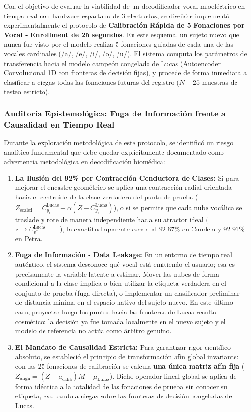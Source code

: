 \documentclass[11pt,a4paper,openany]{book}
\theoremstyle{definition}
\begin{document}
Con el objetivo de evaluar la viabilidad de un decodificador vocal mioeléctrico en tiempo real con hardware espartano de 3 electrodos, se diseñó e implementó experimentalmente el protocolo de \textbf{Calibración Rápida de 5 Fonaciones por Vocal - Enrollment de 25 segundos}. En este esquema, un sujeto nuevo que nunca fue visto por el modelo realiza 5 fonaciones guiadas de cada una de las vocales cardinales (/a/, /e/, /i/, /o/, /u/). El sistema computa los parámetros de transferencia hacia el modelo campeón congelado de Lucas (Autoencoder Convolucional 1D con fronteras de decisión fijas), y procede de forma inmediata a clasificar a ciegas todas las fonaciones futuras del registro ($N - 25$ muestras de testeo estricto).

\subsubsection{Auditoría Epistemológica: Fuga de Información frente a Causalidad en Tiempo Real}
\label{subsubsec:auditoria_epistemologica_trampa}

Durante la exploración metodológica de este protocolo, se identificó un riesgo analítico fundamental que debe quedar explícitamente documentado como advertencia metodológica en decodificación biomédica:
\begin{enumerate}
    \item \textbf{La Ilusión del 92\% por Contracción Conductora de Clases:} Si para mejorar el encastre geométrico se aplica una contracción radial orientada hacia el centroide de la clase verdadera del punto de prueba ($Z_{\text{scaled}} = C_{y_i}^{\text{Lucas}} + \alpha (Z - C_{y_i}^{\text{Lucas}})$), o si se permite que cada nube vocálica se traslade y rote de manera independiente hacia su atractor ideal ($z \mapsto C_{v^*}^{\text{Lucas}} + \dots$), la exactitud aparente escala al $92.67\%$ en Candela y $92.91\%$ en Petra.
    \item \textbf{Fuga de Información - Data Leakage:} En un entorno de tiempo real auténtico, el sistema desconoce qué vocal está emitiendo el usuario; esa es precisamente la variable latente a estimar. Mover las nubes de forma condicional a la clase implica o bien utilizar la etiqueta verdadera en el conjunto de prueba (fuga directa), o implementar un clasificador preliminar de distancia mínima en el espacio nativo del sujeto nuevo. En este último caso, proyectar luego los puntos hacia las fronteras de Lucas resulta cosmético: la decisión ya fue tomada localmente en el nuevo sujeto y el modelo de referencia no actúa como árbitro genuino.
    \item \textbf{El Mandato de Causalidad Estricta:} Para garantizar rigor científico absoluto, se estableció el principio de transformación afín global invariante: con las 25 fonaciones de calibración se calcula \textbf{una única matriz afín fija} ($Z_{\text{align}} = (Z - \mu_{\text{calib}}) M + \mu_{\text{Lucas}}$). Dicho operador lineal global se aplica de forma idéntica a la totalidad de las fonaciones de prueba sin conocer su etiqueta, evaluando a ciegas sobre las fronteras de decisión congeladas de Lucas.
\end{enumerate}
\end{document}
